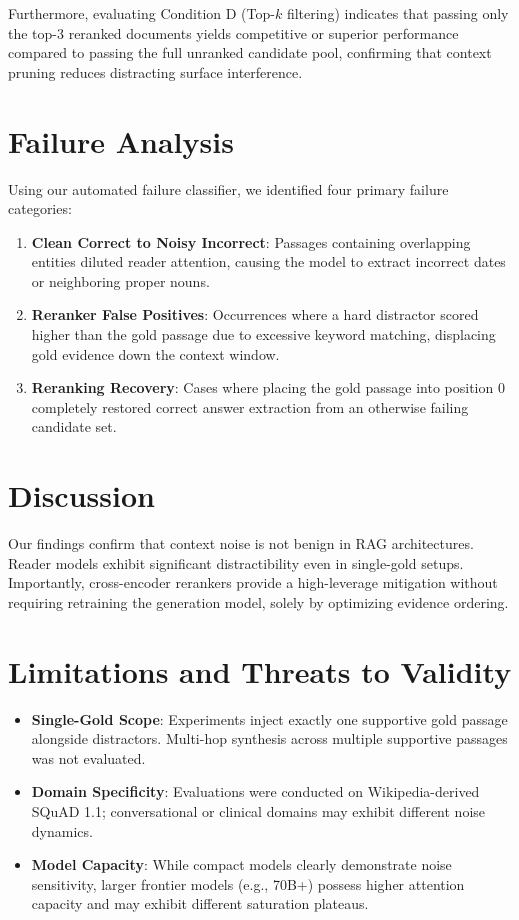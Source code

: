 \documentclass[conference]{IEEEtran}
\begin{document}
Furthermore, evaluating Condition D (Top-$k$ filtering) indicates that passing only the top-3 reranked documents yields competitive or superior performance compared to passing the full unranked candidate pool, confirming that context pruning reduces distracting surface interference.

\section{Failure Analysis}
Using our automated failure classifier, we identified four primary failure categories:
\begin{enumerate}
    \item \textbf{Clean Correct to Noisy Incorrect}: Passages containing overlapping entities diluted reader attention, causing the model to extract incorrect dates or neighboring proper nouns.
    \item \textbf{Reranker False Positives}: Occurrences where a hard distractor scored higher than the gold passage due to excessive keyword matching, displacing gold evidence down the context window.
    \item \textbf{Reranking Recovery}: Cases where placing the gold passage into position 0 completely restored correct answer extraction from an otherwise failing candidate set.
\end{enumerate}

\section{Discussion}
Our findings confirm that context noise is not benign in RAG architectures. Reader models exhibit significant distractibility even in single-gold setups. Importantly, cross-encoder rerankers provide a high-leverage mitigation without requiring retraining the generation model, solely by optimizing evidence ordering.

\section{Limitations and Threats to Validity}
\begin{itemize}
    \item \textbf{Single-Gold Scope}: Experiments inject exactly one supportive gold passage alongside distractors. Multi-hop synthesis across multiple supportive passages was not evaluated.
    \item \textbf{Domain Specificity}: Evaluations were conducted on Wikipedia-derived SQuAD 1.1; conversational or clinical domains may exhibit different noise dynamics.
    \item \textbf{Model Capacity}: While compact models clearly demonstrate noise sensitivity, larger frontier models (e.g., 70B+) possess higher attention capacity and may exhibit different saturation plateaus.
\end{itemize}
\end{document}
